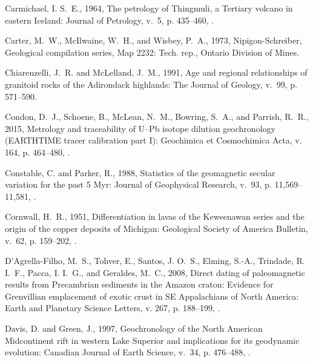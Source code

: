 \documentclass[11pt,letterpaper]{article}
\begin{document}
\begin{thebibliography}{153}
Carmichael, I. S.~E., 1964, {The petrology of Thingmuli, a Tertiary volcano in
  eastern Iceland}: Journal of Petrology, v.~5, p. 435--460,
  .

Carter, M.~W., Mc{I}lwaine, W.~H., and Wisbey, P.~A., 1973, {Nipigon-Schreiber,
  Geological compilation series, Map 2232}: Tech. rep., Ontario Division of
  Mines.

Chiarenzelli, J.~R. and McLelland, J.~M., 1991, Age and regional relationships
  of granitoid rocks of the {A}dirondack highlands: The Journal of Geology,
  v.~99, p. 571--590.

Condon, D.~J., Schoene, B., McLean, N.~M., Bowring, S.~A., and Parrish, R.~R.,
  2015, Metrology and traceability of {U}--{P}b isotope dilution geochronology
  ({EARTHTIME} tracer calibration part {I}): Geochimica et Cosmochimica Acta,
  v. 164, p. 464--480, .

Constable, C. and Parker, R., 1988, Statistics of the geomagnetic secular
  variation for the past 5 {M}yr: Journal of Geophysical Research, v.~93, p.
  11,569--11,581, .

Cornwall, H.~R., 1951, Differentiation in lavas of the {K}eweenawan series and
  the origin of the copper deposits of {M}ichigan: Geological Society of
  America Bulletin, v.~62, p. 159--202,
  .

D'Agrella-Filho, M.~S., Tohver, E., Santos, J. O.~S., Elming, S.-A., Trindade,
  R. I.~F., Pacca, I. I.~G., and Geraldes, M.~C., 2008, Direct dating of
  paleomagnetic results from {P}recambrian sediments in the {A}mazon craton:
  {E}vidence for {G}renvillian emplacement of exotic crust in {SE Appalachians
  of North America}: Earth and Planetary Science Letters, v. 267, p. 188--199,
  .

Davis, D. and Green, J., 1997, Geochronology of the {N}orth {A}merican
  {M}idcontinent rift in western {L}ake {S}uperior and implications for its
  geodynamic evolution: Canadian Journal of Earth Science, v.~34, p. 476--488,
  .


\end{thebibliography}
\end{document}
